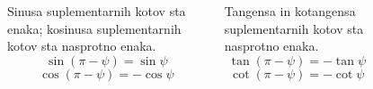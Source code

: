 \begin{frame}
\begin{columns}
\begin{figure}
                    \end{figure}

                            
                    \begin{alertblock}{}
                        Sinusa suplementarnih kotov sta enaka; kosinusa suplementarnih kotov sta nasprotno enaka.
                        $$ \sin\left(\pi-\psi\right) = \sin\psi $$
                        $$ \cos\left(\pi-\psi\right) = -\cos\psi $$
                    \end{alertblock}

                    \begin{alertblock}{}
                        Tangensa in kotangensa suplementarnih kotov sta nasprotno enaka.
                        $$ \tan\left(\pi-\psi\right) = -\tan\psi $$
                        $$ \cot\left(\pi-\psi\right) = -\cot\psi $$        
                    \end{alertblock}


            \end{columns}


        \end{frame}

